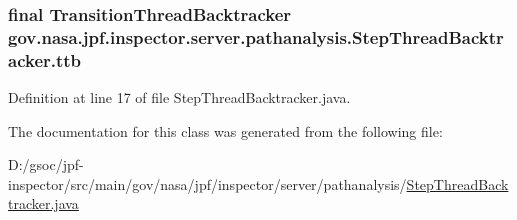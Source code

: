 \subsubsection[{\texorpdfstring{ttb}{ttb}}]{\setlength{\rightskip}{0pt plus 5cm}final {\bf Transition\+Thread\+Backtracker} gov.\+nasa.\+jpf.\+inspector.\+server.\+pathanalysis.\+Step\+Thread\+Backtracker.\+ttb\hspace{0.3cm}{\ttfamily [private]}}\hypertarget{classgov_1_1nasa_1_1jpf_1_1inspector_1_1server_1_1pathanalysis_1_1_step_thread_backtracker_af8116b6e623266190a23e9eee2a48c59}{}\label{classgov_1_1nasa_1_1jpf_1_1inspector_1_1server_1_1pathanalysis_1_1_step_thread_backtracker_af8116b6e623266190a23e9eee2a48c59}


Definition at line 17 of file Step\+Thread\+Backtracker.\+java.



The documentation for this class was generated from the following file\+:\begin{DoxyCompactItemize}
\item 
D\+:/gsoc/jpf-\/inspector/src/main/gov/nasa/jpf/inspector/server/pathanalysis/\hyperlink{_step_thread_backtracker_8java}{Step\+Thread\+Backtracker.\+java}\end{DoxyCompactItemize}
